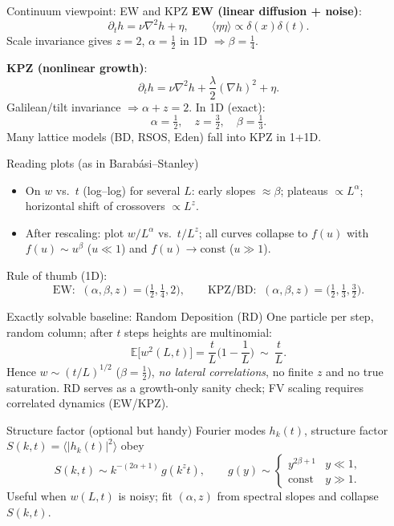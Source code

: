 \documentclass[9pt,table,xcolor=dvipsnames]{beamer}
\begin{document}
\begin{frame}[t]{Continuum viewpoint: EW and KPZ}
\small
\textbf{EW (linear diffusion + noise)}:
\[
\partial_t h=\nu\nabla^2 h+\eta,\qquad \langle\eta\eta\rangle\propto\delta(x)\delta(t).
\]
Scale invariance gives $z=2$, $\alpha=\tfrac12$ in 1D $\Rightarrow \beta=\tfrac14$.

\medskip
\textbf{KPZ (nonlinear growth)}:
\[
\partial_t h=\nu\nabla^2 h+\frac{\lambda}{2}(\nabla h)^2+\eta.
\]
Galilean/tilt invariance $\Rightarrow \alpha+z=2$. In 1D (exact):
\[
\boxed{\alpha=\tfrac12,\quad z=\tfrac32,\quad \beta=\tfrac13.}
\]
Many lattice models (BD, RSOS, Eden) fall into KPZ in 1+1D.
\end{frame}

\begin{frame}[t]{Reading plots (as in Barabási–Stanley)}
\small
\begin{itemize}\itemsep2pt
\item On $w$ vs.\ $t$ (log–log) for several $L$: early slopes $\approx\beta$; plateaus $\propto L^{\alpha}$; horizontal shift of crossovers $\propto L^{z}$.
\item After rescaling: plot $w/L^{\alpha}$ vs.\ $t/L^{z}$; all curves collapse to $f(u)$ with
  $f(u)\sim u^{\beta}$ ($u\!\ll\!1$) and $f(u)\to \text{const}$ ($u\!\gg\!1$).
\end{itemize}
Rule of thumb (1D):
\[
\text{EW: }\ (\alpha,\beta,z)=\Big(\tfrac12,\tfrac14,2\Big),
\qquad
\text{KPZ/BD: }\ (\alpha,\beta,z)=\Big(\tfrac12,\tfrac13,\tfrac32\Big).
\]
\end{frame}

\begin{frame}[t]{Exactly solvable baseline: Random Deposition (RD)}
\small
One particle per step, random column; after $t$ steps heights are multinomial:
\[
\mathbb E\big[w^2(L,t)\big]=\frac{t}{L}\Big(1-\frac1L\Big)\ \sim\ \frac{t}{L}.
\]
Hence $w\sim (t/L)^{1/2}$ ($\beta=\tfrac12$), \emph{no lateral correlations}, no finite $z$ and no true saturation. RD serves as a growth-only sanity check; FV scaling requires correlated dynamics (EW/KPZ).
\end{frame}

\begin{frame}[t]{Structure factor (optional but handy)}
\small
Fourier modes $h_k(t)$, structure factor $S(k,t)=\langle|h_k(t)|^2\rangle$ obey
\[
S(k,t)\sim k^{-(2\alpha+1)}\,g(k^{z}t),\qquad
g(y)\sim\begin{cases}
y^{2\beta+1} & y\ll1,\\
\text{const} & y\gg1.
\end{cases}
\]
Useful when $w(L,t)$ is noisy; fit $(\alpha,z)$ from spectral slopes and collapse $S(k,t)$.
\end{frame}
\end{document}
